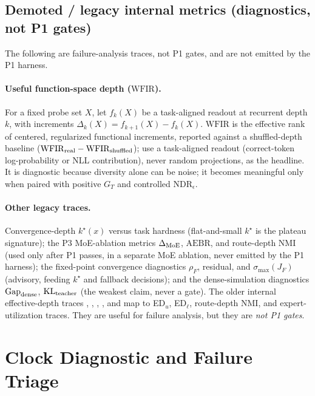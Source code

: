 \documentclass[11pt]{article}
\newcommand{\code}[1]{\texttt{#1}}
\begin{document}
\subsection{Demoted / legacy internal metrics (diagnostics, not P1 gates)}
\label{ssec:demoted}
The following are failure-analysis traces, not P1 gates, and are not emitted by the P1 harness.

\paragraph{Useful function-space depth (\(\mathrm{WFIR}\)).}
For a fixed probe set \(X\), let \(f_k(X)\) be a task-aligned readout at recurrent depth \(k\), with
increments \(\Delta_k(X)=f_{k+1}(X)-f_k(X)\).  \(\mathrm{WFIR}\) is the effective rank of centered,
regularized functional increments, reported against a shuffled-depth baseline
(\(\mathrm{WFIR}_{\rm real}-\mathrm{WFIR}_{\rm shuffled}\)); use a task-aligned readout (correct-token
log-probability or NLL contribution), never random projections, as the headline.  It is diagnostic
because diversity alone can be noise; it becomes meaningful only when paired with positive \(G_T\) and
controlled \(\mathrm{NDR}_\epsilon\).

\paragraph{Other legacy traces.}
Convergence-depth \(k^\star(x)\) versus task hardness (flat-and-small \(k^\star\) is the plateau
signature); the P3 MoE-ablation metrics \(\Delta_{\rm MoE}\), \(\mathrm{AEBR}\), and route-depth NMI
(used only after P1 passes, in a separate MoE ablation, never emitted by the P1 harness); the
fixed-point convergence diagnostics \(\rho_F\), residual, and \(\sigma_{\max}(J_F)\) (advisory, feeding
\(k^\star\) and fallback decisions); and the dense-simulation diagnostics \(\mathrm{Gap}_{\rm dense}\),
\(\mathrm{KL}_{\rm teacher}\) (the weakest claim, never a gate).  The older internal effective-depth
traces \code{}, \code{},
\code{}, \code{}, and
\code{} map to ED\(_u\), ED\(_\ell\), route-depth NMI, and
expert-utilization traces.  They are useful for failure analysis, but they are \emph{not P1 gates}.

\section{Clock Diagnostic and Failure Triage}
\label{sec:triage}
\end{document}
